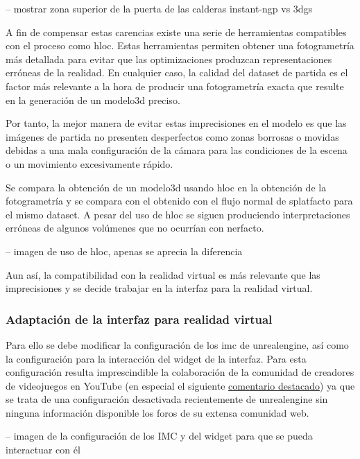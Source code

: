 \documentclass[a4paper, 12pt, spanish, twoside]{article}
\begin{document}
-- mostrar zona superior de la puerta de las calderas instant-ngp vs 3dgs 

A fin de compensar estas carencias existe una serie de herramientas compatibles con el proceso como \acrshort{hloc}. Estas herramientas permiten obtener una fotogrametría más detallada para evitar que las optimizaciones produzcan representaciones erróneas de la realidad. En cualquier caso, la calidad del \gls{dataset} de partida es el factor más relevante a la hora de producir una fotogrametría exacta que resulte en la generación de un \gls{modelo3d} preciso.  

Por tanto, la mejor manera de evitar estas imprecisiones en el modelo es que las imágenes de partida no presenten desperfectos como zonas borrosas o movidas debidas a una mala configuración de la cámara para las condiciones de la escena o un movimiento excesivamente rápido. 

Se compara la obtención de un \gls{modelo3d} usando \acrshort{hloc} en la obtención de la fotogrametría y se compara con el obtenido con el flujo normal de \gls{splatfacto} para el mismo \gls{dataset}. A pesar del uso de \acrshort{hloc} se siguen produciendo interpretaciones erróneas de algunos volúmenes que no ocurrían con \gls{nerfacto}.  

-- imagen de uso de hloc, apenas se aprecia la diferencia 

Aun así, la compatibilidad con la realidad virtual es más relevante que las imprecisiones y se decide trabajar en la interfaz para la realidad virtual. 

\subsubsection{Adaptación de la interfaz para realidad virtual} \label{sec:implementacion:3dgs-volinga:adaptacion}

Para ello se debe modificar la configuración de los \acrfull{imc} de \gls{unrealengine}, así como la configuración para la interacción del \gls{widget} de la interfaz. Para esta configuración resulta imprescindible la colaboración de la comunidad de creadores de videojuegos en YouTube (en especial el siguiente \href{https://www.youtube.com/watch?v=kM27HYbpvc0&lc=Ugw7MlymoPWPie05Jx54AaABAg}{comentario destacado}) ya que se trata de una configuración desactivada recientemente de \gls{unrealengine} sin ninguna información disponible los foros de su extensa comunidad web. 

-- imagen de la configuración de los IMC y del widget para que se pueda interactuar con él  
\end{document}
